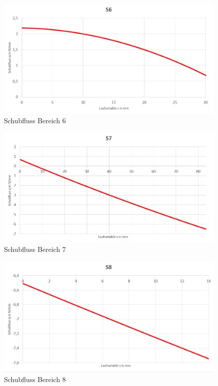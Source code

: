 \begin{figure}[h]
	\includegraphics[width=1.0\textwidth]{Bilder/S6.png}
	\caption{Schubfluss Bereich 6}
\end{figure}
\begin{figure}[h]
	\includegraphics[width=1.0\textwidth]{Bilder/S7.png}
	\caption{Schubfluss Bereich 7}
\end{figure}
\begin{figure}[h]
	\includegraphics[width=1.0\textwidth]{Bilder/S8.png}
	\caption{Schubfluss Bereich 8}
\end{figure}
